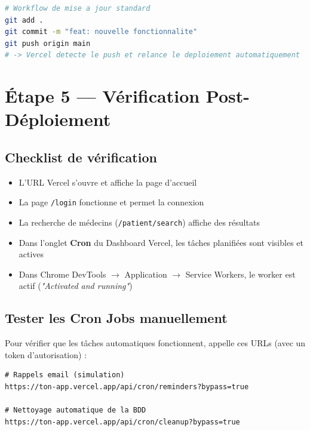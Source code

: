 \documentclass[12pt, a4paper]{article}
\begin{document}
\begin{lstlisting}[language=bash]
# Workflow de mise a jour standard
git add .
git commit -m "feat: nouvelle fonctionnalite"
git push origin main
# -> Vercel detecte le push et relance le deploiement automatiquement
\end{lstlisting}

\section{Étape 5 — Vérification Post-Déploiement}

\subsection{Checklist de vérification}

\begin{itemize}[label=$\checkmark$]
  \item L'URL Vercel s'ouvre et affiche la page d'accueil
  \item La page \texttt{/login} fonctionne et permet la connexion
  \item La recherche de médecins (\texttt{/patient/search}) affiche des résultats
  \item Dans l'onglet \textbf{Cron} du Dashboard Vercel, les tâches planifiées
        sont visibles et actives
  \item Dans Chrome DevTools $\rightarrow$ Application $\rightarrow$ Service Workers, le worker
        est actif (\textit{"Activated and running"})
\end{itemize}

\subsection{Tester les Cron Jobs manuellement}

Pour vérifier que les tâches automatiques fonctionnent, appelle ces URLs
(avec un token d'autorisation) :

\begin{lstlisting}
# Rappels email (simulation)
https://ton-app.vercel.app/api/cron/reminders?bypass=true

# Nettoyage automatique de la BDD
https://ton-app.vercel.app/api/cron/cleanup?bypass=true
\end{lstlisting}
\end{document}
